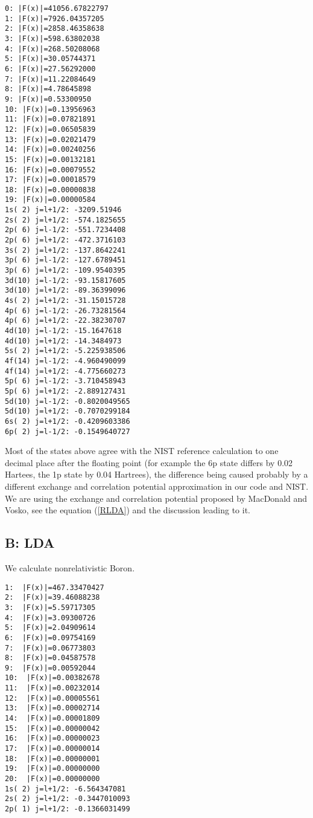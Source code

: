 \begin{lstlisting}
0: |F(x)|=41056.67822797
1: |F(x)|=7926.04357205
2: |F(x)|=2858.46358638
3: |F(x)|=598.63802038
4: |F(x)|=268.50208068
5: |F(x)|=30.05744371
6: |F(x)|=27.56292000
7: |F(x)|=11.22084649
8: |F(x)|=4.78645898
9: |F(x)|=0.53300950
10: |F(x)|=0.13956963
11: |F(x)|=0.07821891
12: |F(x)|=0.06505839
13: |F(x)|=0.02021479
14: |F(x)|=0.00240256
15: |F(x)|=0.00132181
16: |F(x)|=0.00079552
17: |F(x)|=0.00018579
18: |F(x)|=0.00000838
19: |F(x)|=0.00000584
1s( 2) j=l+1/2: -3209.51946
2s( 2) j=l+1/2: -574.1825655
2p( 6) j=l-1/2: -551.7234408
2p( 6) j=l+1/2: -472.3716103
3s( 2) j=l+1/2: -137.8642241
3p( 6) j=l-1/2: -127.6789451
3p( 6) j=l+1/2: -109.9540395
3d(10) j=l-1/2: -93.15817605
3d(10) j=l+1/2: -89.36399096
4s( 2) j=l+1/2: -31.15015728
4p( 6) j=l-1/2: -26.73281564
4p( 6) j=l+1/2: -22.38230707
4d(10) j=l-1/2: -15.1647618
4d(10) j=l+1/2: -14.3484973
5s( 2) j=l+1/2: -5.225938506
4f(14) j=l-1/2: -4.960490099
4f(14) j=l+1/2: -4.775660273
5p( 6) j=l-1/2: -3.710458943
5p( 6) j=l+1/2: -2.889127431
5d(10) j=l-1/2: -0.8020049565
5d(10) j=l+1/2: -0.7070299184
6s( 2) j=l+1/2: -0.4209603386
6p( 2) j=l-1/2: -0.1549640727
\end{lstlisting}

Most of the states above agree with the NIST reference calculation\cite{nist}
to one decimal place after the floating point (for example the 6p state differs
by 0.02 Hartees, the 1p state by 0.04 Hartrees), the
difference being caused probably by a different exchange and correlation
potential approximation in our code and NIST. We are using the exchange and
correlation potential proposed by MacDonald and Vosko, see the equation
(\ref{RLDA}) and the discussion leading to it.

\subsection{B: LDA}

We calculate nonrelativistic Boron.

\begin{lstlisting}
1:  |F(x)|=467.33470427
2:  |F(x)|=39.46088238
3:  |F(x)|=5.59717305
4:  |F(x)|=3.09300726
5:  |F(x)|=2.04909614
6:  |F(x)|=0.09754169
7:  |F(x)|=0.06773803
8:  |F(x)|=0.04587578
9:  |F(x)|=0.00592044
10:  |F(x)|=0.00382678
11:  |F(x)|=0.00232014
12:  |F(x)|=0.00005561
13:  |F(x)|=0.00002714
14:  |F(x)|=0.00001809
15:  |F(x)|=0.00000042
16:  |F(x)|=0.00000023
17:  |F(x)|=0.00000014
18:  |F(x)|=0.00000001
19:  |F(x)|=0.00000000
20:  |F(x)|=0.00000000
1s( 2) j=l+1/2: -6.564347081
2s( 2) j=l+1/2: -0.3447010093
2p( 1) j=l+1/2: -0.1366031499
\end{lstlisting}

